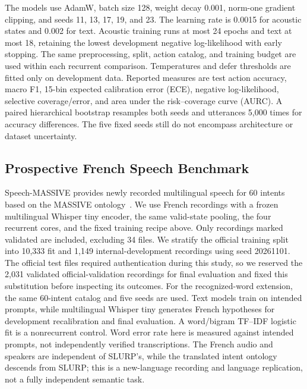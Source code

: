 \documentclass[conference]{IEEEtran}
\begin{document}
The models use AdamW, batch size 128, weight decay 0.001, norm-one gradient clipping, and seeds 11, 13, 17, 19, and 23. The learning rate is 0.0015 for acoustic states and 0.002 for text. Acoustic training runs at most 24 epochs and text at most 18, retaining the lowest development negative log-likelihood with early stopping. The same preprocessing, split, action catalog, and training budget are used within each recurrent comparison. Temperatures and defer thresholds are fitted only on development data. Reported measures are test action accuracy, macro F1, 15-bin expected calibration error (ECE), negative log-likelihood, selective coverage/error, and area under the risk--coverage curve (AURC). A paired hierarchical bootstrap resamples both seeds and utterances 5,000 times for accuracy differences. The five fixed seeds still do not encompass architecture or dataset uncertainty.

\subsection{Prospective French Speech Benchmark}
Speech-MASSIVE provides newly recorded multilingual speech for 60 intents based on the MASSIVE ontology~\cite{speechmassive}. We use French recordings with a frozen multilingual Whisper tiny encoder, the same valid-state pooling, the four recurrent cores, and the fixed training recipe above. Only recordings marked validated are included, excluding 34 files. We stratify the official training split into 10,333 fit and 1,149 internal-development recordings using seed 20261101. The official test files required authentication during this study, so we reserved the 2,031 validated official-validation recordings for final evaluation and fixed this substitution before inspecting its outcomes. For the recognized-word extension, the same 60-intent catalog and five seeds are used. Text models train on intended prompts, while multilingual Whisper tiny generates French hypotheses for development recalibration and final evaluation. A word/bigram TF--IDF logistic fit is a nonrecurrent control. Word error rate here is measured against intended prompts, not independently verified transcriptions. The French audio and speakers are independent of SLURP's, while the translated intent ontology descends from SLURP; this is a new-language recording and language replication, not a fully independent semantic task.
\end{document}
